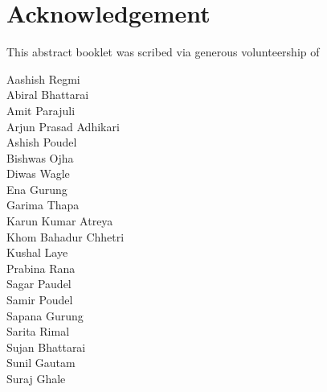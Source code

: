\chapter*{Acknowledgement}

This abstract booklet was scribed via generous volunteership of
\vspace{50pt}
\begin{multicols}{2}
\noindent 
Aashish Regmi
\vspace{10pt}\\Abiral Bhattarai
\vspace{10pt}\\Amit Parajuli
\vspace{10pt}\\Arjun Prasad Adhikari
\vspace{10pt}\\Ashish Poudel
\vspace{10pt}\\Bishwas Ojha
\vspace{10pt}\\Diwas Wagle
\vspace{10pt}\\Ena Gurung
\vspace{10pt}\\Garima Thapa
\vspace{10pt}\\Karun Kumar Atreya
\vspace{10pt}\\Khom Bahadur Chhetri
\vspace{10pt}\\Kushal Laye
\vspace{10pt}\\Prabina Rana
\vspace{10pt}\\Sagar Paudel
\vspace{10pt}\\Samir Poudel
\vspace{10pt}\\Sapana Gurung
\vspace{10pt}\\Sarita Rimal
\vspace{10pt}\\Sujan Bhattarai
\vspace{10pt}\\Sunil Gautam
\vspace{10pt}\\Suraj Ghale
\end{multicols}